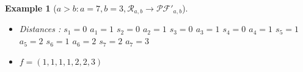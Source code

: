 \documentclass[12pt]{report}
\newtheorem*{example}{Example}
\begin{document}
\begin{example}[$a > b : a = 7, b = 3,
    \mathcal{R}_{a,b} \to \mathcal{PF'}_{a,b}$]
\begin{center}
\begin{tikzpicture}[scale=1]
        \end{tikzpicture}
    \end{center}
    \begin{itemize}
        \item Distances : 
            \subitem $s_1 = 0$
                \hspace{2cm} $a_1 = 1$
            \subitem $s_2 = 0$
                \hspace{2cm} $a_2 = 1$
            \subitem $s_3 = 0$
                \hspace{2cm} $a_3 = 1$
            \subitem $s_4 = 0$
                \hspace{2cm} $a_4 = 1$
            \subitem $s_5 = 1$
                \hspace{2cm} $a_5 = 2$
            \subitem $s_6 = 1$
                \hspace{2cm} $a_6 = 2$
            \subitem $s_7 = 2$
                \hspace{2cm} $a_7 = 3$
        \item $f = (1, 1, 1, 1, 2, 2, 3)$
    \end{itemize}
    
\end{example}
\end{document}
